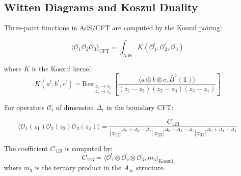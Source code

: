 \subsection{Witten Diagrams and Koszul Duality}

\begin{technique}[Witten Diagram = Koszul Pairing]
Three-point functions in AdS/CFT are computed by the Koszul pairing:

$$\langle \mathcal{O}_1 \mathcal{O}_2 \mathcal{O}_3 \rangle_{\text{CFT}} = \int_{\text{AdS}} K(\mathcal{O}_1^!, \mathcal{O}_2^!, \mathcal{O}_3^!)$$

where $K$ is the Koszul kernel:
$$K(a^!, b^!, c^!) = \text{Res}_{\substack{z_1 \to z_2 \\ z_2 \to z_3}} \left[\frac{\langle a \otimes b \otimes c, \bar{B}^3(\mathbb{1}) \rangle}{(z_1-z_2)(z_2-z_3)(z_3-z_1)}\right]$$
\end{technique}

\begin{example}
For operators $\mathcal{O}_i$ of dimension $\Delta_i$ in the boundary CFT:

$$\langle \mathcal{O}_1(z_1) \mathcal{O}_2(z_2) \mathcal{O}_3(z_3) \rangle = \frac{C_{123}}{|z_{12}|^{\Delta_1+\Delta_2-\Delta_3}|z_{23}|^{\Delta_2+\Delta_3-\Delta_1}|z_{31}|^{\Delta_3+\Delta_1-\Delta_2}}$$

The coefficient $C_{123}$ is computed by:
$$C_{123} = \langle \mathcal{O}_1^! \otimes \mathcal{O}_2^! \otimes \mathcal{O}_3^!, m_3 \rangle_{\text{Koszul}}$$
where $m_3$ is the ternary product in the $A_\infty$ structure.
\end{example}
